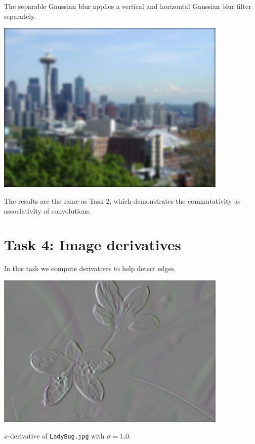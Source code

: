 \documentclass[letterpaper]{article}
\begin{document}
The separable Gaussian blur applies a vertical and horizontal Gaussian blur
filter separately.

\begin{center}
\includegraphics[width=0.85\textwidth]{task3.png}
\end{center}

The results are the same as Task 2, which demonstrates the commutativity as
associativity of convolutions.

\section*{Task 4: Image derivatives}

In this task we compute derivatives to help detect edges.

\begin{center}
  \includegraphics[width=0.85\textwidth]{task4a.png}
  
  $x$-derivative of \texttt{LadyBug.jpg} with $\sigma = 1.0$.
\end{center}
\end{document}
